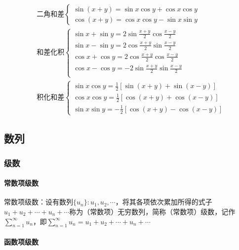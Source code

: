 \documentclass[12pt]{book}
\begin{document}
\begin{align*}
&\text{二角和差}\begin{cases}
    \sin(x+y) = \sin{x}\cos{y}+\cos{x}\cos{y} \\
    \cos(x+y) = \cos{x}\cos{y}-\sin{x}\sin{y}
\end{cases}\\
&\text{和差化积}\begin{cases}
    \sin{x}+\sin{y} = 2 \sin{\frac{x+y}{2}}\cos{\frac{x-y}{2}}\\
    \sin{x}-\sin{y} = 2 \cos{\frac{x+y}{2}}\sin{\frac{x-y}{2}}\\
    \cos{x}+\cos{y} = 2 \cos{\frac{x+y}{2}}\cos{\frac{x-y}{2}}\\
    \cos{x}-\cos{y} = -2\sin{\frac{x+y}{2}}\sin{\frac{x-y}{2}}\\
\end{cases}\\
&\text{积化和差}\begin{cases}
    \sin{x}\cos{y} = \frac{1}{2} [\sin{(x+y)}+\sin{(x-y)}] \\
    \cos{x}\cos{y} = \frac{1}{2} [\cos{(x+y)}+\cos{(x-y)}] \\
    \sin{x}\sin{y} =-\frac{1}{2} [\cos{(x+y)}-\cos{(x-y)}]
\end{cases}
\end{align*}




\subsection{数列}



\subsubsection{级数}



\paragraph{常数项级数}
常数项级数：设有数列$\{u_n\}: u_{1},u_{2},\cdots$，将其各项依次累加所得的式子$u_{1}+u_{2}+\cdots+u_{n}+\cdots$称为（常数项）无穷数列，简称（常数项）级数，记作$\sum_{n=1}^{\infty}{u_n}$，即$\sum_{n=1}^{\infty}{u_n} = u_{1}+u_{2}+\cdots+u_{n}+\cdots$

\paragraph{函数项级数}
\end{document}
